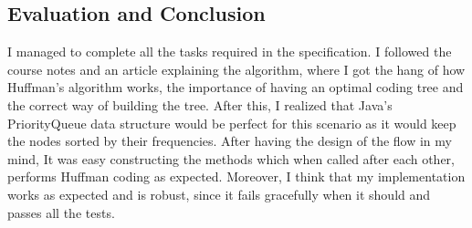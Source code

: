 \documentclass{article}
\begin{document}
		\subsection{Evaluation and Conclusion}
		
		I managed to complete all the tasks required in the specification. I followed the course notes and an article explaining the algorithm\cite{hc}, where I got the hang of how Huffman's algorithm works, the importance of having an optimal coding tree and the correct way of building the tree. After this, I realized that Java's PriorityQueue data structure would be perfect for this scenario as it would keep the nodes sorted by their frequencies. After having the design of the flow in my mind, It was easy constructing the methods which when called after each other, performs Huffman coding as expected. Moreover, I think that my implementation works as expected and is robust, since it fails gracefully when it should and passes all the tests.
				
				
				


					

					

					
					
					
			
			
		
		\nocite{*}

			
		
			
					
			
\end{document}
